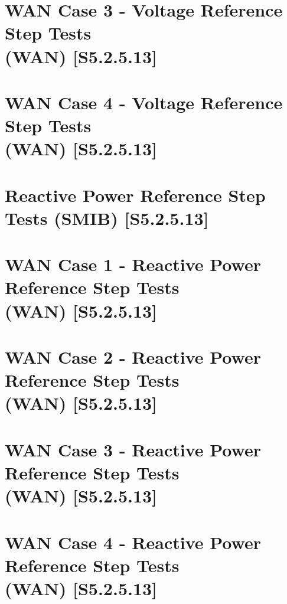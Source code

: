 \documentclass{../grid-link-report}
\begin{document}
	\section{WAN Case 3 - Voltage Reference Step Tests 
		\\
		(WAN) [S5.2.5.13]}
	\label{WAN Case 3 - Voltage Reference Step Tests (WAN) [S5.2.5.13]}
	
	\section{WAN Case 4 - Voltage Reference Step Tests 
		\\
		(WAN) [S5.2.5.13]}
	\label{WAN Case 4 - Voltage Reference Step Tests (WAN) [S5.2.5.13]}
	
	\section{Reactive Power Reference Step Tests (SMIB) [S5.2.5.13]}
	\label{Reactive Power Reference Step Tests (SMIB) [S5.2.5.13]}
	
	\section{WAN Case 1 - Reactive Power Reference Step Tests 
		\\
		(WAN) [S5.2.5.13]}
	\label{WAN Case 1 - Reactive Power Reference Step Tests (WAN) [S5.2.5.13]}
	
	\section{WAN Case 2 - Reactive Power Reference Step Tests 
		\\
		(WAN) [S5.2.5.13]}
	\label{WAN Case 2 - Reactive Power Reference Step Tests (WAN) [S5.2.5.13]}
	
	\section{WAN Case 3 - Reactive Power Reference Step Tests 
		\\
		(WAN) [S5.2.5.13]}
	\label{WAN Case 3 - Reactive Power Reference Step Tests (WAN) [S5.2.5.13]}
	
	\section{WAN Case 4 - Reactive Power Reference Step Tests 
		\\
		(WAN) [S5.2.5.13]}
	\label{WAN Case 4 - Reactive Power Reference Step Tests (WAN) [S5.2.5.13]}
	
\end{document}
